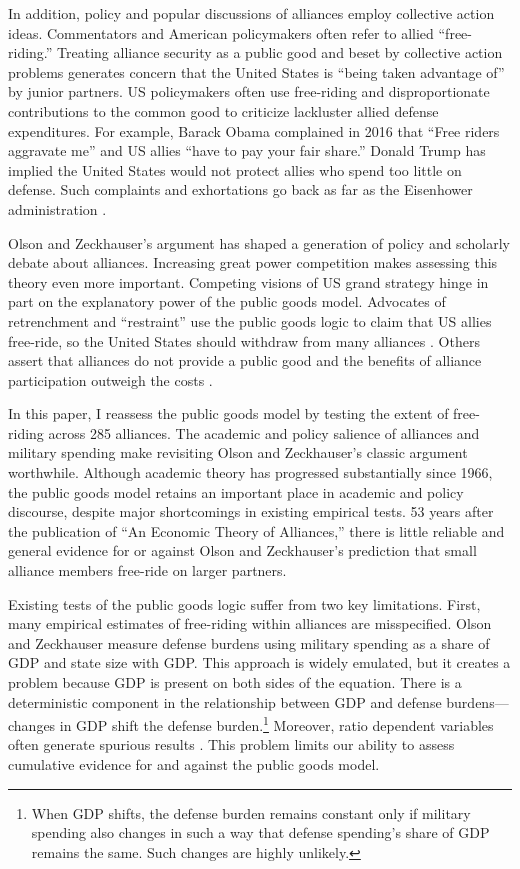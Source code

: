 \documentclass[12pt]{article}
\begin{document}
In addition, policy and popular discussions of alliances employ collective action ideas.
Commentators and American policymakers often refer to allied ``free-riding.'' 
Treating alliance security as a public good and beset by collective action problems generates concern that the United States is ``being taken advantage of'' by junior partners. 
US policymakers often use free-riding and disproportionate contributions to the common good to criticize lackluster allied defense expenditures.  
For example, Barack Obama complained in 2016 that ``Free riders aggravate me'' and US allies ``have to pay your fair share.'' 
Donald Trump has implied the United States would not protect allies who spend too little on defense. 
Such complaints and exhortations go back as far as the Eisenhower administration \citep{Lanoszka2015}.


Olson and Zeckhauser's argument has shaped a generation of policy and scholarly debate about alliances. 
Increasing great power competition makes assessing this theory even more important. 
Competing visions of US grand strategy hinge in part on the explanatory power of the public goods model. 
Advocates of retrenchment and ``restraint'' use the public goods logic to claim that US allies free-ride, so the United States should withdraw from many alliances \citep{Preble2009, Posen2014}. 
Others assert that alliances do not provide a public good and the benefits of alliance participation outweigh the costs \citep{Brooksetal2013, BrandsFeaver2017}. 


In this paper, I reassess the public goods model by testing the extent of free-riding across 285 alliances. 
The academic and policy salience of alliances and military spending make revisiting Olson and Zeckhauser's classic argument worthwhile.
Although academic theory has progressed substantially since 1966, the public goods model retains an important place in academic and policy discourse, despite major shortcomings in existing empirical tests.
53 years after the publication of ``An Economic Theory of Alliances,'' there is little reliable and general evidence for or against Olson and Zeckhauser's prediction that small alliance members free-ride on larger partners. 


Existing tests of the public goods logic suffer from two key limitations.
First, many empirical estimates of free-riding within alliances are misspecified.
Olson and Zeckhauser measure defense burdens using military spending as a share of GDP and state size with GDP.
This approach is widely emulated, but it creates a problem because GDP is present on both sides of the equation.
There is a deterministic component in the relationship between GDP and defense burdens--- changes in GDP shift the defense burden.\footnote{
When GDP shifts, the defense burden remains constant only if military spending also changes in such a way that defense spending's share of GDP remains the same. Such changes are highly unlikely.}  
Moreover, ratio dependent variables often generate spurious results \citep{Kronmal1993}.
This problem limits our ability to assess cumulative evidence for and against the public goods model. 
 
\end{document}
